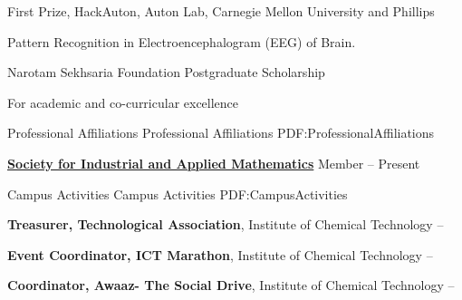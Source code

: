 \documentclass[letterpaper,MMMyyyy,nonstopmode]{simpleresumecv}
\begin{document}
\begin{Body}
\Gap
\BulletItem
First Prize,
HackAuton, Auton Lab, Carnegie Mellon University and Phillips
\hfill
{}
\begin{Detail}
\Item
Pattern Recognition in Electroencephalogram (EEG) of Brain.
\end{Detail}

\Gap
\BulletItem
Narotam Sekhsaria Foundation Postgraduate Scholarship
\hfill
{}
\begin{Detail}
\Item
For academic and co-curricular excellence
\end{Detail}


\Section
{Professional Affiliations}
{Professional Affiliations}
{PDF:ProfessionalAffiliations}

\Entry
\href{http://www.siam.org/}
{\textbf{Society for Industrial and Applied Mathematics}}
\Gap
\BulletItem
Member
\hfill
{} --
Present


\Section
{Campus Activities}
{Campus Activities}
{PDF:CampusActivities}

\Entry
\textbf{Treasurer, Technological Association},
Institute of Chemical Technology
\hfill
{} --

\Entry
\textbf{Event Coordinator, ICT Marathon},
Institute of Chemical Technology
\hfill
{} --

\Entry
\textbf{Coordinator, Awaaz- The Social Drive},
Institute of Chemical Technology
\hfill
{} --

\end{Body}
\end{document}
